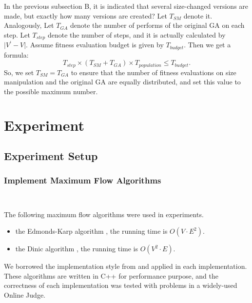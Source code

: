 \documentclass[a4paper, 10pt, conference]{ieeeconf}      %
\begin{document}
In the previous subsection B, it is indicated that several size-changed versions are made, but exactly how many versions are created? Let $T_{SM}$ denote it. Analogously, Let $T_{GA}$ denote the number of performs of the original GA on each step. Let $T_{step}$ denote the number of steps, and it is actually calculated by $\vert V^\prime - V \vert$. Assume fitness evaluation budget is given by $T_{budget}$. Then we get a formula:
\[
    T_{step} \times (T_{SM} + T_{GA}) \times T_{population} \le T_{budget}.
\]
So, we set $T_{SM}=T_{GA}$ to ensure that the number of fitness evaluations on size manipulation and the original GA are equally distributed, and set this value to the possible maximum number.



\section{Experiment}

\subsection{Experiment Setup}

\subsubsection{Implement Maximum Flow Algorithms}~

The following maximum flow algorithms were used in experiments.

\begin{itemize}

\item the Edmonds-Karp algorithm \cite{c2}, the running time is $O(V \cdot E^{2})$.
\item the Dinic algorithm \cite{c3}, the running time is $O(V^{2} \cdot E )$.

\end{itemize}

We borrowed the implementation style from \cite{c6} and applied in each implementation.
These algorithms are written in C++ for performance purpose, and the correctness of
each implementation was tested with problems in a widely-used Online Judge.
\end{document}
